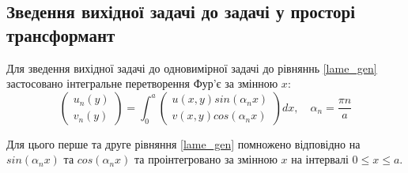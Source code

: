 \subsection{Зведення вихідної задачі до задачі у просторі трансформант}
Для зведення вихідної задачі до одновимірної задачі до рівняннь \eqref{lame_gen} застосовано інтегральне перетворення Фур'є за змінною $x$:
\begin{equation}\label{int_trans_gen}
    \begin{pmatrix}
        u_n(y) \\
        v_n(y)
    \end{pmatrix} = \int_{0}^{a} 
    \begin{pmatrix}
        u(x,y) sin(\alpha_n x) \\
        v(x,y) cos(\alpha_n x)
    \end{pmatrix} dx, \quad \alpha_n = \frac{\pi n}{a}
\end{equation}

Для цього перше та друге рівняння \eqref{lame_gen} помножено відповідно на $sin(\alpha_n x)$ та $cos(\alpha_n x)$ та проінтегровано за змінною $x$ на інтервалі $0 \le x \le a$.



